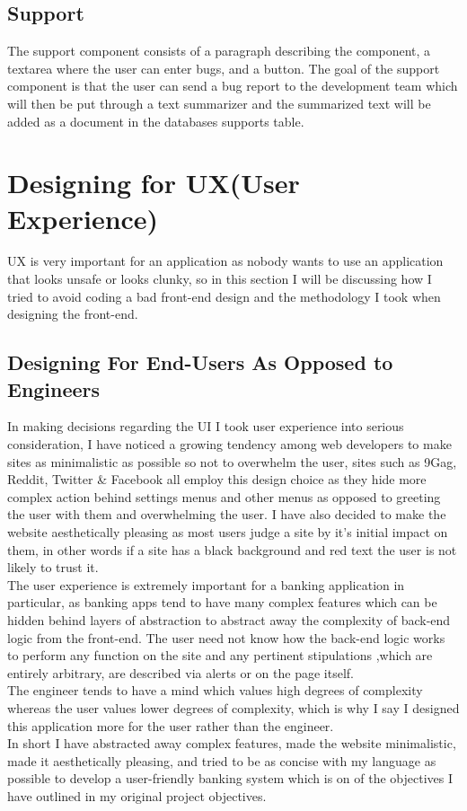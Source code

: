 \subsection{Support}
The support component consists of a paragraph describing the component, a textarea where the user can enter bugs, and a button.  The goal of the support component is that the user can send a bug report to the development team which will then be put through a text summarizer and the summarized text will be added as a document in the databases supports table.

\section{Designing for UX(User Experience)}
UX is very important for an application as nobody wants to use an application that looks unsafe or looks clunky, so in this section I will be discussing how I tried to avoid coding a bad front-end design and the methodology I took when designing the front-end.
\subsection{Designing For End-Users As Opposed to Engineers}
In making decisions regarding the UI I took user experience into serious consideration,
I have noticed a growing tendency among web developers to make sites as minimalistic as
possible so not to overwhelm the user, sites such as 9Gag, Reddit, Twitter \& Facebook
all employ this design choice as they hide more complex action behind settings menus
and other menus as opposed to greeting the user with them and overwhelming the user.  I have also decided to
make the website aesthetically pleasing as most users judge a site by it's initial
impact on them, in other words if a site has a black background and red text the user
is not likely to trust it.
\\
The user experience is extremely important for a banking application in particular,
as banking apps tend to have many complex features which can be hidden behind layers
of abstraction to abstract away the complexity of back-end logic from the front-end.
The user need not know how the back-end logic works to perform any function on the
site and any pertinent stipulations ,which are entirely arbitrary, are described via
alerts or on the page itself.
\\
The engineer tends to have a mind which values high degrees of complexity whereas
the user values lower degrees of complexity, which is why I say I designed this
application more for the user rather than the engineer.
\\
In short I have abstracted away complex features, made the website minimalistic,
made it aesthetically pleasing, and tried to be as concise with my language as
possible to develop a user-friendly banking system which is on of the objectives
I have outlined in my original project objectives.
